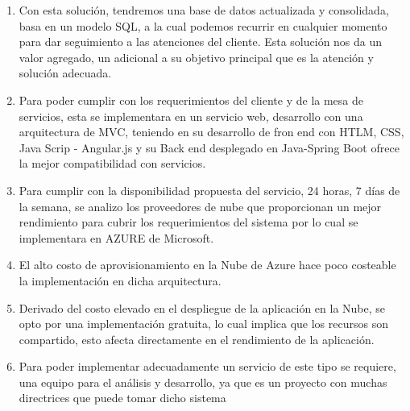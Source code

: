 \begin{enumerate}[1.]
\item Con esta solución, tendremos una base de datos actualizada y consolidada, basa en un modelo SQL, a la cual podemos recurrir en cualquier momento para dar seguimiento a las atenciones del cliente. Esta solución nos da un valor agregado, un adicional a su objetivo principal que es la atención y solución adecuada.

\item Para poder cumplir con los requerimientos del cliente y de la mesa de servicios, esta  se implementara en un servicio web, desarrollo con una arquitectura de MVC, teniendo en su desarrollo de fron end con HTLM,  CSS, Java Scrip - Angular.js y su Back end desplegado en Java-Spring Boot ofrece la mejor compatibilidad con  servicios.


\item Para cumplir con la disponibilidad propuesta del servicio, 24 horas, 7 días de la semana, se analizo los proveedores de nube que proporcionan un mejor rendimiento para cubrir  los requerimientos del sistema por lo cual se implementara en AZURE de Microsoft.
\item El alto costo de aprovisionamiento en la Nube de Azure hace poco costeable la implementación en dicha arquitectura. 
\item Derivado del costo elevado en el despliegue de la aplicación en la Nube, se opto por una implementación gratuita, lo cual implica que los recursos son compartido, esto afecta directamente en el rendimiento de la aplicación. 

\item Para poder implementar adecuadamente un servicio de este tipo se requiere, una equipo para el análisis y desarrollo, ya que es un proyecto con muchas directrices que puede tomar dicho sistema





\end{enumerate}


